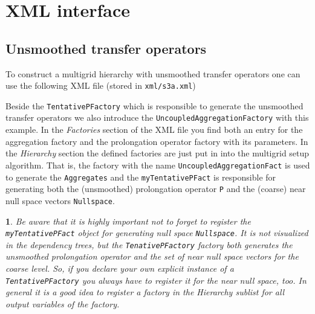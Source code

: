 \documentclass[10pt,fleqn]{book}
\newtheorem*{mycomment}{\ding{42}}
\begin{document}
\section{XML interface}

\subsection{Unsmoothed transfer operators}
To construct a multigrid hierarchy with unsmoothed transfer operators one can use the following XML file (stored in \texttt{xml/s3a.xml})



Beside the \verb|TentativePFactory| which is responsible to generate the unsmoothed transfer operators we also introduce the \verb|UncoupledAggregationFactory| with this example. In the \textit{Factories} section of the XML file you find both an entry for the aggregation factory and the prolongation operator factory with its parameters. In the \textit{Hierarchy} section the defined factories are just put in into the multigrid setup algorithm. That is, the factory with the name \verb|UncoupledAggregationFact| is used to generate the \verb|Aggregates| and the \verb|myTentativePFact| is responsible for generating both the (unsmoothed) prolongation operator \verb|P| and the (coarse) near null space vectors \verb|Nullspace|.\\

\begin{mycomment}
Be aware that it is highly important not to forget to register the \verb|myTentativePFact| object for generating null space \verb|Nullspace|. It is not visualized in the dependency trees, but the \verb|TenativePFactory| factory both generates the unsmoothed prolongation operator and the set of near null space vectors for the coarse level. So, if you declare your own explicit instance of a \verb|TentativePFactory| you always have to register it for the near null space, too. In general it is a good idea to register a factory in the \textit{Hierarchy} sublist for all output variables of the factory.
\end{mycomment}
\end{document}
